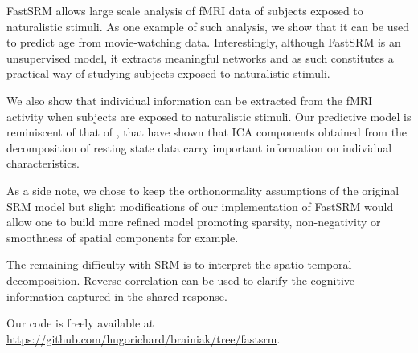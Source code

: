 FastSRM allows large scale analysis of fMRI data of subjects exposed to naturalistic stimuli. As one example of such analysis, we show that it can be used to predict age from movie-watching data. Interestingly, although FastSRM is an unsupervised model, it extracts meaningful networks and as such constitutes a practical way of studying subjects exposed to naturalistic stimuli.

We also show that individual information can be extracted from the fMRI activity when subjects are exposed to naturalistic stimuli. Our predictive model is reminiscent of that of \cite{bijsterbosch2018relationship}, that have shown that ICA components obtained from the decomposition of resting state data carry important information on individual characteristics. 
%

As a side note, we chose to keep the orthonormality assumptions of the original SRM model but slight modifications of our implementation of FastSRM would allow one to build more refined model promoting sparsity, non-negativity or smoothness of spatial components for example.

The remaining difficulty with SRM is to interpret the spatio-temporal decomposition. Reverse correlation \cite{hasson2004intersubject} can be used to clarify the cognitive information captured in the shared response.

Our code is freely available at \url{https://github.com/hugorichard/brainiak/tree/fastsrm}.

